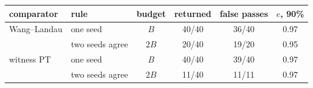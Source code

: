 \begin{tabular}{llcccc}
\toprule
comparator & rule & budget & returned & false passes & $e$, 90\% \\
\midrule
Wang--Landau & one seed & $B$ & 40/40 & 36/40 & 0.97 \\
 & two seeds agree & $2B$ & 20/40 & 19/20 & 0.95 \\
witness PT & one seed & $B$ & 40/40 & 39/40 & 0.97 \\
 & two seeds agree & $2B$ & 11/40 & 11/11 & 0.97 \\
\bottomrule
\end{tabular}
